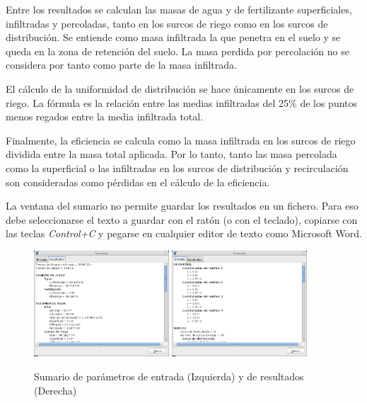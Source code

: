 Entre los resultados se calculan las masas de agua y de fertilizante superficiales, infiltradas y percoladas, tanto en los surcos de riego como en los surcos de distribución. Se entiende como masa infiltrada la que penetra en el suelo y se queda en la zona de retención del suelo. La masa perdida por percolación no se considera por tanto como parte de la masa infiltrada.

El cálculo de la uniformidad de distribución se hace únicamente en los surcos de riego. La fórmula es la relación entre las medias infiltradas del 25\% de los puntos menos regados entre la media infiltrada total.

Finalmente, la eficiencia se calcula como la masa infiltrada en los surcos de riego dividida entre la masa total aplicada. Por lo tanto, tanto las masa percolada como la superficial o las infiltradas en los surcos de distribución y recirculación son consideradas como pérdidas en el cálculo de la eficiencia.

La ventana del sumario no permite guardar los resultados en un fichero. Para eso debe seleccionarse el texto a guardar con el ratón (o con el teclado), copiarse con las teclas \emph{Control+C} y pegarse en cualquier editor de texto como Microsoft Word.


\begin{figure}[!h]
\begin{center}
\includegraphics[width=0.45\textwidth]{images/sumario.png}
\qquad
\includegraphics[width=0.45\textwidth]{images/sumario2.png}
\caption{Sumario de parámetros de entrada (Izquierda) y de resultados (Derecha)}\label{wInforme}
\end{center}
\end{figure}


